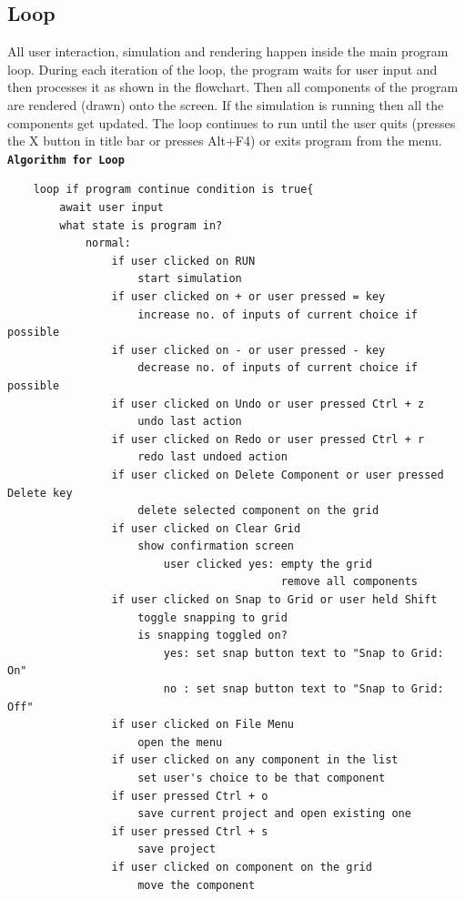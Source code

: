 \documentclass[report.tex]{subfiles}
\begin{document}
    \subsection{Loop}
    All user interaction, simulation and rendering happen inside the main program loop. During each iteration of the loop, the program waits for user input and then processes it as shown in the flowchart. Then all components of the program are rendered (drawn) onto the screen. If the simulation is running then all the components get updated. The loop continues to run until the user quits (presses the X button in title bar or presses Alt+F4) or exits program from the menu.\\
        \textbf{\texttt{Algorithm for Loop}}
        \begin{verbatim}
    loop if program continue condition is true{
        await user input
        what state is program in?
            normal:
                if user clicked on RUN
                    start simulation
                if user clicked on + or user pressed = key
                    increase no. of inputs of current choice if possible
                if user clicked on - or user pressed - key
                    decrease no. of inputs of current choice if possible
                if user clicked on Undo or user pressed Ctrl + z
                    undo last action
                if user clicked on Redo or user pressed Ctrl + r
                    redo last undoed action
                if user clicked on Delete Component or user pressed Delete key
                    delete selected component on the grid
                if user clicked on Clear Grid
                    show confirmation screen
                        user clicked yes: empty the grid
                                          remove all components
                if user clicked on Snap to Grid or user held Shift
                    toggle snapping to grid
                    is snapping toggled on?
                        yes: set snap button text to "Snap to Grid: On"
                        no : set snap button text to "Snap to Grid: Off"
                if user clicked on File Menu
                    open the menu
                if user clicked on any component in the list
                    set user's choice to be that component
                if user pressed Ctrl + o
                    save current project and open existing one
                if user pressed Ctrl + s
                    save project
                if user clicked on component on the grid
                    move the component

\end{verbatim}
\end{document}
